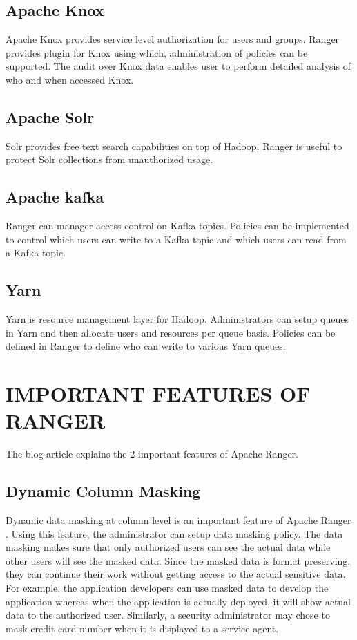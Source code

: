 \documentclass[9pt,twocolumn,twoside]{../../styles/osajnl}
\begin{document}
\subsection{Apache Knox}
Apache Knox provides service level authorization for users and groups. Ranger
 provides plugin for Knox using which, administration of policies can be
 supported. The audit over Knox data enables user to perform detailed
 analysis of who and when accessed Knox.

\subsection{Apache Solr}
Solr provides free text search capabilities on top of Hadoop. Ranger is
useful to protect Solr collections from unauthorized usage.

\subsection{Apache kafka}
Ranger can manager access control on Kafka topics. Policies can be
implemented to control which users can write to a Kafka topic and which users
can read from a Kafka topic.

\subsection{Yarn}
Yarn is resource management layer for Hadoop. Administrators can setup queues
 in Yarn and then allocate users and resources per queue basis. Policies can
 be defined in Ranger to define who can write to various Yarn queues.

\section{IMPORTANT FEATURES OF RANGER}
The blog article \cite{www-ranger-key-features} explains the 2 important
features of Apache Ranger.

\subsection{Dynamic Column Masking}
Dynamic data masking at column level is an important feature of Apache Ranger
. Using this feature, the administrator can setup data masking policy. The
data masking makes sure that only authorized users can see the actual data
while other users will see the masked data. Since the masked data is format
preserving, they can continue their work without getting access to the actual
 sensitive data. For example, the application developers can use masked data
 to develop the application whereas when the application is actually
 deployed, it will show actual data to the authorized user. Similarly, a
 security administrator may chose to mask credit card number when it is
 displayed to a service agent.
\end{document}
